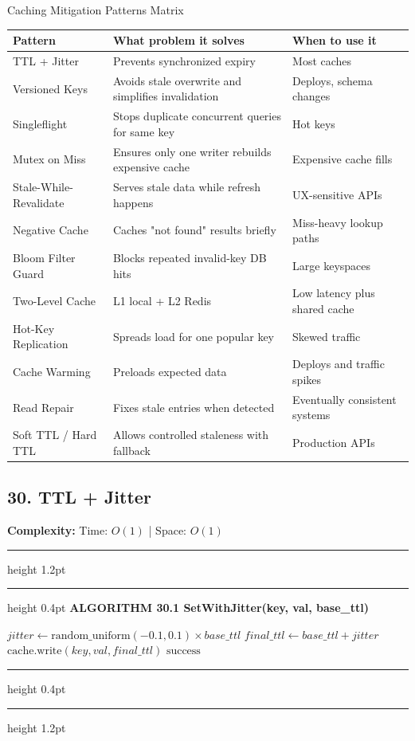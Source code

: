 \documentclass[11pt,a4paper]{article}
\newenvironment{textbookalgo}[2]{%
  \par\addvspace{1.2em}\noindent
  \hrule height 1.2pt
  \vspace{1.5pt}
  \hrule height 0.4pt
  \vspace{5pt}
  {\noindent\large\bfseries\sffamily ALGORITHM #1 \quad #2}
  \par\vspace{5pt}
  \RestyleAlgo{plain}
}{%
  \par\vspace{4pt}
  \hrule height 0.4pt
  \vspace{1.5pt}
  \hrule height 1.2pt
  \par\addvspace{1.2em}
}
\theoremstyle{definition}
\begin{document}
\begin{infobox}{Caching Mitigation Patterns Matrix}
\small
\centering
\begin{tabularx}{\textwidth}{lXX}
\toprule
\textbf{Pattern} & \textbf{What problem it solves} & \textbf{When to use it} \\
\midrule
TTL + Jitter & Prevents synchronized expiry & Most caches \\
\addlinespace
Versioned Keys & Avoids stale overwrite and simplifies invalidation & Deploys, schema changes \\
\addlinespace
Singleflight & Stops duplicate concurrent queries for same key & Hot keys \\
\addlinespace
Mutex on Miss & Ensures only one writer rebuilds expensive cache & Expensive cache fills \\
\addlinespace
Stale-While-Revalidate & Serves stale data while refresh happens & UX-sensitive APIs \\
\addlinespace
Negative Cache & Caches "not found" results briefly & Miss-heavy lookup paths \\
\addlinespace
Bloom Filter Guard & Blocks repeated invalid-key DB hits & Large keyspaces \\
\addlinespace
Two-Level Cache & L1 local + L2 Redis & Low latency plus shared cache \\
\addlinespace
Hot-Key Replication & Spreads load for one popular key & Skewed traffic \\
\addlinespace
Cache Warming & Preloads expected data & Deploys and traffic spikes \\
\addlinespace
Read Repair & Fixes stale entries when detected & Eventually consistent systems \\
\addlinespace
Soft TTL / Hard TTL & Allows controlled staleness with fallback & Production APIs \\
\bottomrule
\end{tabularx}
\end{infobox}

\clearpage
\subsection{30. TTL + Jitter}

\noindent
\textbf{Complexity:} Time: $O(1)$ | Space: $O(1)$
\smallskip

\begin{textbookalgo}{30.1}{SetWithJitter(key, val, base\_ttl)}
\begin{algorithm}[H]
$jitter \leftarrow \text{random\_uniform}(-0.1, 0.1) \times base\_ttl$\;
$final\_ttl \leftarrow base\_ttl + jitter$\;
$\text{cache.write}(key, val, final\_ttl)$\;
\Return $\text{success}$\;
\end{algorithm}
\end{textbookalgo}
\end{document}
